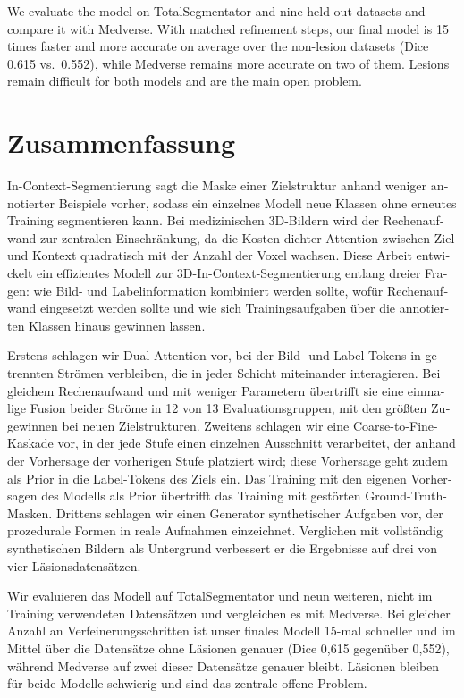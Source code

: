 \documentclass[hidelinks, a4paper, 12pt, ngerman, english]{article}  %
\begin{document}
We evaluate the model on TotalSegmentator and nine held-out datasets and
compare it with Medverse. With matched refinement steps, our final model is
15 times faster and more accurate on average over the non-lesion datasets
(Dice 0.615 vs.\ 0.552), while Medverse remains more accurate on two of them.
Lesions remain difficult for both models and are the main open problem.%
\section*{Zusammenfassung}
\begin{otherlanguage}{ngerman}
In-Context-Segmentierung sagt die Maske einer Zielstruktur anhand weniger
annotierter Beispiele vorher, sodass ein einzelnes Modell neue Klassen ohne
erneutes Training segmentieren kann. Bei medizinischen 3D-Bildern wird der
Rechenaufwand zur zentralen Einschränkung, da die Kosten dichter Attention
zwischen Ziel und Kontext quadratisch mit der Anzahl der Voxel wachsen. Diese
Arbeit entwickelt ein effizientes Modell zur 3D-In-Context-Segmentierung
entlang dreier Fragen: wie Bild- und Labelinformation kombiniert werden
sollte, wofür Rechenaufwand eingesetzt werden sollte und wie sich
Trainingsaufgaben über die annotierten Klassen hinaus gewinnen lassen.

Erstens schlagen wir Dual Attention vor, bei der Bild- und Label-Tokens in
getrennten Strömen verbleiben, die in jeder Schicht miteinander interagieren.
Bei gleichem Rechenaufwand und mit weniger Parametern übertrifft sie eine
einmalige Fusion beider Ströme in 12 von 13 Evaluationsgruppen, mit den
größten Zugewinnen bei neuen Zielstrukturen. Zweitens schlagen wir eine
Coarse-to-Fine-Kaskade vor, in der jede Stufe einen einzelnen Ausschnitt
verarbeitet, der anhand der Vorhersage der vorherigen Stufe platziert wird;
diese Vorhersage geht zudem als Prior in die Label-Tokens des Ziels ein. Das
Training mit den eigenen Vorhersagen des Modells als Prior übertrifft das
Training mit gestörten Ground-Truth-Masken. Drittens schlagen wir einen
Generator synthetischer Aufgaben vor, der prozedurale Formen in reale
Aufnahmen einzeichnet. Verglichen mit vollständig synthetischen Bildern als
Untergrund verbessert er die Ergebnisse auf drei von vier Läsionsdatensätzen.

Wir evaluieren das Modell auf TotalSegmentator und neun weiteren, nicht im
Training verwendeten Datensätzen und vergleichen es mit Medverse. Bei gleicher
Anzahl an Verfeinerungsschritten ist unser finales Modell 15-mal schneller und
im Mittel über die Datensätze ohne Läsionen genauer (Dice 0,615 gegenüber
0,552), während Medverse auf zwei dieser Datensätze genauer bleibt. Läsionen
bleiben für beide Modelle schwierig und sind das zentrale offene Problem.
\end{otherlanguage}
\end{document}
